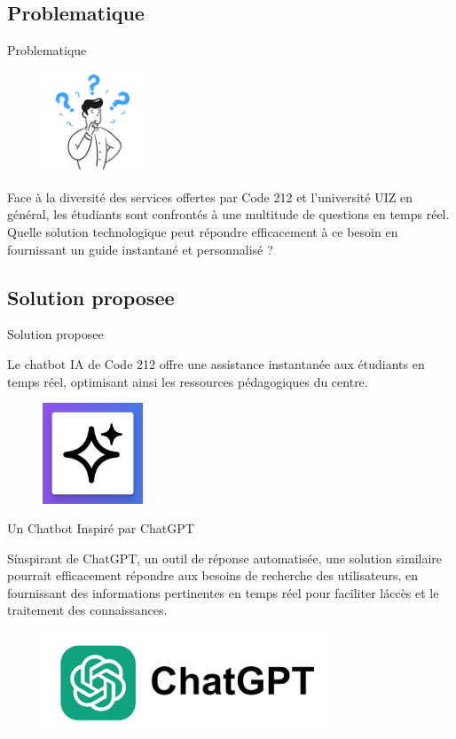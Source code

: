 \subsection{Problematique}
\begin{frame}{Problematique}
    \begin{figure}[htpb]
        \centering
        \includegraphics[height=3cm]{assets/images/question.png}
    \end{figure}
    Face à la diversité des services offertes par Code 212 et l'université UIZ en général, les étudiants sont confrontés à une multitude de questions en temps réel. Quelle solution technologique peut répondre efficacement à ce besoin en fournissant un guide instantané et personnalisé ?
\end{frame}

\subsection{Solution proposee}
\begin{frame}{Solution proposee}

    Le chatbot IA de Code 212 offre une assistance instantanée aux étudiants en temps réel, optimisant ainsi les ressources pédagogiques du centre.
    \begin{figure}[htpb]
        \centering
        \includegraphics[height=3cm]{assets/images/ia.png}
    \end{figure}
\end{frame}

\begin{frame}{Un Chatbot Inspiré par ChatGPT}

    S\'inspirant de ChatGPT, un outil de réponse automatisée, une solution similaire pourrait efficacement répondre aux besoins de recherche des utilisateurs, en fournissant des informations pertinentes en temps réel pour faciliter l\'accès et le traitement des connaissances.

    \begin{figure}[htpb]
        \centering
        \includegraphics[height=3cm]{assets/images/chatgpt.png}
    \end{figure}
\end{frame}

